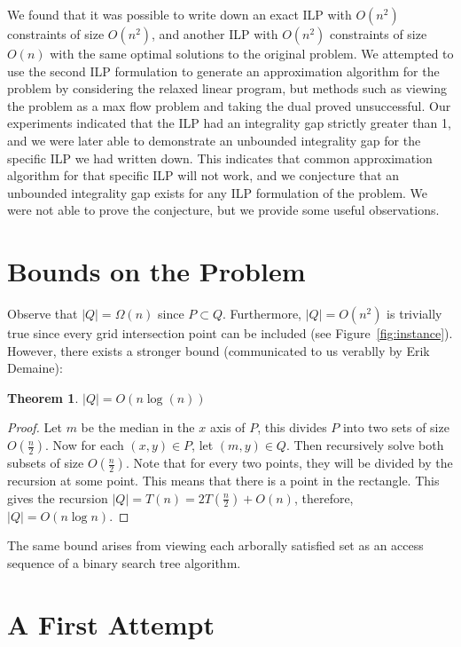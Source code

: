 \documentclass[11pt]{article}
\newtheorem{theorem}{Theorem}
\begin{document}
We found that it was possible to write down an exact ILP with $O(n^2)$ constraints of size $O(n^2)$, and another ILP with $O(n^2)$ constraints of size $O(n)$ with the same optimal solutions to the original problem. We attempted to use the second ILP formulation to generate an approximation algorithm for the problem by considering the relaxed linear program, but methods such as viewing the problem as a max flow problem and taking the dual proved unsuccessful. Our experiments indicated that the ILP had an integrality gap strictly greater than 1, and we were later able to demonstrate an unbounded integrality gap for the specific ILP we had written down. This indicates that common approximation algorithm for that specific ILP will not work, and we conjecture that an unbounded integrality gap exists for any ILP formulation of the problem. We were not able to prove the conjecture, but we provide some useful observations.

\section{Bounds on the Problem}

Observe that $|Q| = \Omega(n)$ since $P \subset Q$. Furthermore, $|Q| = O(n^2)$ is trivially true since every grid intersection point can be included (see Figure~\ref{fig:instance}). However, there exists a stronger bound (communicated to us verablly by Erik Demaine):

\begin{theorem} $|Q| = O(n\log(n))$
\end{theorem}
\begin{proof}
Let $m$ be the median in the $x$ axis of $P$, this divides $P$ into two sets of size $O(\frac{n}{2})$. Now for each $(x,y) \in P$, let $(m, y) \in Q$. Then recursively solve both subsets of size $O(\frac{n}{2})$. Note that for every two points, they will be divided by the recursion at some point. This means that there is a point in the rectangle. This gives the recursion $|Q| = T(n) = 2T(\frac{n}{2}) + O(n)$, therefore, $|Q| = O(n \log n)$. 
\end{proof}

The same bound arises from viewing each arborally satisfied set as an access sequence of a binary search tree algorithm. \cite{geometryBST}

\section{A First Attempt}
\end{document}

